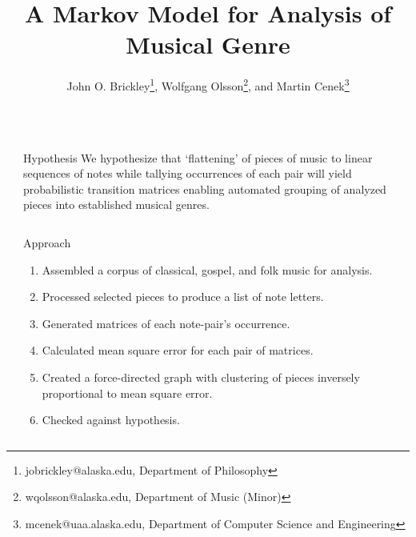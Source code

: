 \documentclass[final]{beamer}
\title{A Markov Model for Analysis of Musical Genre} %
\author{John O. Brickley\footnote{jobrickley@alaska.edu, Department of Philosophy}, Wolfgang Olsson\footnote{wqolsson@alaska.edu, Department of Music (Minor)}, and Martin Cenek\footnote{mcenek@uaa.alaska.edu, Department of Computer Science and Engineering}}
\newlength{\sepwid}
\newlength{\onecolwid}
\begin{document}

\setlength\belowcaptionskip{0ex} %
\setlength\belowdisplayshortskip{0ex} %

\begin{frame}[t] %

\begin{columns}[t] %

\begin{column}{\sepwid}\end{column} %

\begin{column}{\onecolwid} %

\begin{alertblock}{Hypothesis}
We hypothesize that `flattening' of pieces of music to linear sequences of notes while tallying occurrences of each pair will yield probabilistic transition matrices enabling automated grouping of analyzed pieces into established musical genres.
\end{alertblock}

\begin{column}{\onecolwid} %
\begin{block}{Approach}
\begin{enumerate}
\item Assembled a corpus of classical, gospel, and folk music for analysis.
\item Processed selected pieces to produce a list of note letters.
\item Generated matrices of each note-pair's occurrence.
\item Calculated mean square error for each pair of matrices.
\item Created a force-directed graph with clustering of pieces inversely proportional to mean square error.
\item Checked against hypothesis.
\end{enumerate}
\end{block}
\end{column}



\end{column}
\end{columns}
\end{frame}
\end{document}
